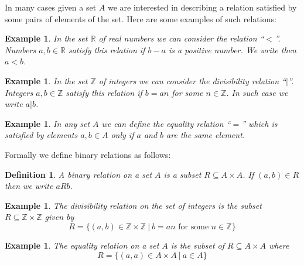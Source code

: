 \documentclass[11pt, letterpaper, oneside]{report}
\theoremstyle{pplain}
\newtheorem{ITERMVALUE THM}[theorem]{Intermediate Value Theorem}
\newtheorem{HEINEBOREL THM}[theorem]{Heine-Borel Theorem}
\newtheorem{UMETR THM}[theorem]{Urysohn Metrization Theorem}
\newtheorem{UMETR2 THM}[theorem]{Urysohn Metrization Theorem (v.2)}
\theoremstyle{ddefinition}
\newtheorem{definition}[theorem]{Definition}
\newtheorem{example}[theorem]{Example}
\theoremstyle{nnn}
\newtheorem{TDA NN}[theorem]{Topological Data Analysis. }
\theoremstyle{eexercise}
\newcommand{\Z}{{\mathbb Z}}
\newcommand{\R}{{\mathbb R}}
\begin{document}
In many cases given a set $A$ we are interested in describing a relation satisfied by some pairs of elements 
of the set. Here are some examples of such relations:

\begin{example}
In the set $\R$ of real numbers we can consider the relation ``$<$''.  Numbers $a, b\in \R$ satisfy this relation if 
$b-a$ is a positive number. We write then $a< b$.  
\end{example}

\begin{example}
In the set $\Z$ of integers we can consider the divisibility relation ``$|$''.  Integers $a, b\in \Z$ satisfy this relation 
if $b = an$ for some $n\in \Z$. In such case we write $a | b$.  
\end{example}

\begin{example}
In any set $A$ we can define the equality relation ``$=$'' which is satisfied by elements $a, b\in A$ only if 
$a$ and $b$ are the same element.  
\end{example}

Formally we define binary relations as follows: 


\begin{definition}
\label{BINARYREL DEF}
A \emph{binary relation}  on a set $A$ is a subset $R \subseteq A\times A$. 
If $(a, b) \in R$ then we  write $a R b$.  
\end{definition}


\begin{example}
The divisibility relation on the set of integers is the subset $R\subseteq \Z\times \Z$ given by 
$$R = \{ (a, b)\in \Z\times \Z \ | \ b = an \text{ for some } n\in \Z \}$$
\end{example}

\begin{example}
The equality relation on a set $A$ is the subset of $R \subseteq A\times A$ where 
$$R = \{(a, a)\in A\times A \ | \ a\in  A\}$$
\end{example}
\end{document}
